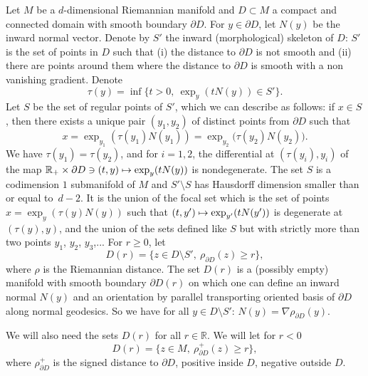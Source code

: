 \documentclass[10pt]{amsart}
\let\backslash\setminus
\newcommand\mto{\mathchoice{\longmapsto}{\mapsto}{\mapsto}{\mapsto}}
\theoremstyle{plain}
\theoremstyle{definition}
\newcommand{\RR}{{\mathbb R}}
\let\n\nabla
\let\pa\partial
\begin{document}
Let $M$ be a $d$-dimensional Riemannian manifold
{and} $D\subset M$ a {compact and} connected domain with smooth boundary $\partial D$. For $y\in \partial D$, let $N(y)$ be the inward normal vector. Denote by $S'$ the inward (morphological) skeleton of $D$: $S'$ is the set of points in $D$ such that (i) the distance to $\partial D$ is not smooth
and (ii) there are points around them where the distance to $\pa D$ is smooth with a non vanishing gradient. Denote
\begin{equation}
\label{2.1}
\tau(y)=\inf\{t>0,\ \exp_y(t N(y))\in S'\}.
\end{equation}
Let $S$ be the set of regular points of $S'$, which we can describe as follows:
if $x\in S$, then there exists a unique pair $(y_1,y_2)$ of distinct points from $\partial D$ such that
\begin{equation}
\label{2.2}
x=\exp_{y_1}\left(\tau(y_1)N(y_1)\right)=\exp_{y_2}\bigl(\tau(y_2)N(y_2)\bigr).
\end{equation}
We have $\tau(y_1)=\tau(y_2)$, and for $i=1,2$, the differential at $(\tau(y_i),y_i)$ of the map $\RR_+\times \partial D\ni (t,y)\mto \exp_y(tN(y))$ is nondegenerate. The set $S$ is a codimension $1$ submanifold of $M$
and $S'\backslash S$ has Hausdorff dimension smaller than or equal to~$d-2$. It is the
union of the focal set which is the set of points $x=\exp_y(\tau(y)N(y))$ such that $(t,y')\mto \exp_{y'}(tN(y'))$ is degenerate at $(\tau(y), y)$, and the union of the sets defined like $S$ but with {strictly} more than two points $y_1$, $y_2$, {$y_3$,...}
For $r\ge 0$, let
\begin{equation}
\label{2.3}
D(r)=\{z\in D\backslash S', \ \rho_{\partial D} (z)\ge r\},
\end{equation}
{where $\rho$ is the Riemannian distance.}
The set $D(r)$ is a {(possibly empty)} manifold with smooth boundary $\partial D(r)$ on which one can define an inward normal $N(y)$ and an orientation by parallel transporting oriented basis of $\partial D$ along normal geodesics. So we have for all $y\in D\backslash S'$: $N(y)=\n \rho_{\partial D}(y)$.

We will also need the sets $D(r)$ for all $r\in\RR$. We will let for $r<0$
\begin{equation}
\label{2.3.1}
D(r)=\{z\in M, \ \rho^+_{\partial D} (z)\ge r\},
\end{equation}
where $\rho^+_{\partial D}$ is the signed distance to $\partial D$, positive inside $D$, negative outside $D$.
\end{document}
